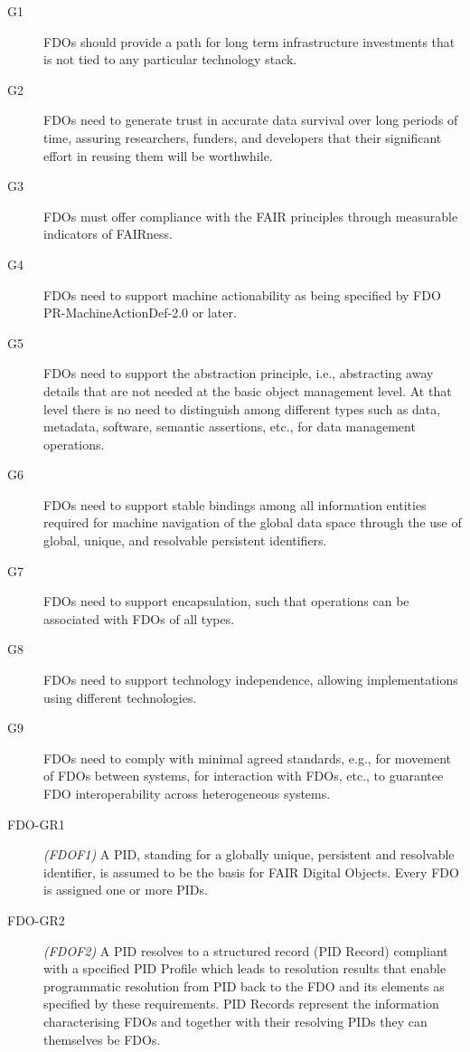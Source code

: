 \begin{description}
    \label{ch10:fdo-guidelines}
        \small
\item[G1] FDOs should provide a path for long term infrastructure investments that is not tied to any particular technology stack. 
\item[G2] FDOs need to generate trust in accurate data survival over long periods of time, assuring researchers, funders, and developers that their significant effort in reusing them will be worthwhile. 
\item[G3] FDOs must offer compliance with the \acrshort{FAIR} principles through measurable indicators of FAIRness.
\item[G4] FDOs need to support machine actionability as being specified by FDO PR-MachineActionDef-2.0 \cite{Weiland 2022b} or later. 
\item[G5] FDOs need to support the abstraction principle, i.e., abstracting away details that are not needed at the basic object management level.  At that level there is no need to distinguish among different types such as data, metadata, software, semantic assertions, etc., for data management operations. 
\item[G6] FDOs need to support stable bindings among all information entities required for machine navigation of the global data space through the use of global, unique, and resolvable persistent identifiers. 
\item[G7] FDOs need to support encapsulation, such that operations can be associated with FDOs of all types.  
\item[G8] FDOs need to support technology independence, allowing implementations using different technologies. 
\item[G9] FDOs need to comply with minimal agreed standards, e.g., for movement of FDOs between systems, for interaction with FDOs, etc., to guarantee FDO interoperability across heterogeneous systems.
\item[FDO-GR1] \emph{(FDOF1)} A \acrshort{PID}, standing for a globally unique, persistent and resolvable identifier, is assumed to be the basis for FAIR Digital Objects.  Every FDO is assigned one or more PIDs. 
\item[FDO-GR2] \emph{(FDOF2)} A PID resolves to a structured record (PID Record) compliant with a specified PID Profile which leads to resolution results that enable programmatic resolution from PID back to the FDO and its elements as specified by these requirements.  PID Records represent the information characterising FDOs and together with their resolving PIDs they can themselves be FDOs.

\end{description}
